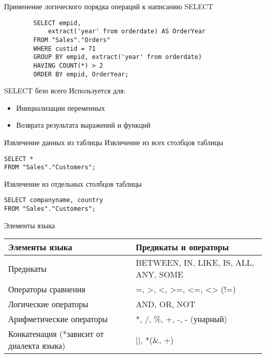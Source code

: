 \documentclass[12pt]{article}
\begin{document}
\begin{Example}{Применение логического порядка операций к написанию SELECT}
    \begin{lstlisting}
        SELECT empid,
            extract('year' from orderdate) AS OrderYear
        FROM "Sales"."Orders"
        WHERE custid = 71
        GROUP BY empid, extract('year' from orderdate)
        HAVING COUNT(*) > 2
        ORDER BY empid, OrderYear;
    \end{lstlisting}
\end{Example}

\begin{Remark}{SELECT безо всего}
    Используется для:

    \begin{itemize}
        \item Инициализации переменных
        \item Возврата результата выражений и функций
    \end{itemize}
\end{Remark}

\begin{Example}{Извлечение данных из таблицы}
    Извлечение из всех столбцов таблицы 
    \begin{lstlisting}
SELECT *
FROM "Sales"."Customers";
    \end{lstlisting}

    Извлечение из отдельных столбцов таблицы 
    \begin{lstlisting}
SELECT companyname, country
FROM "Sales"."Customers";
    \end{lstlisting}
\end{Example}

\begin{nota}{Элементы языка}
    \begin{center}
        \begin{tabular}{|m{15em}|m{20em}|}
            \hline
            Элементы языка & Предикаты и операторы \\
            \hline
            Предикаты & BETWEEN, IN, LIKE, IS, ALL, ANY, SOME \\
            \hline
            Операторы сравнения & =, >, <, >=, <=, <> (!=) \\
            \hline
            Логические операторы & AND, OR, NOT \\
            \hline
            Арифметические операторы & *, /, \%, +, -, - (унарный) \\
            \hline
            Конкатенация (*зависит от диалекта языка) & ||, *(\&, +) \\
            \hline
        \end{tabular}
    \end{center}
\end{nota}
\end{document}
